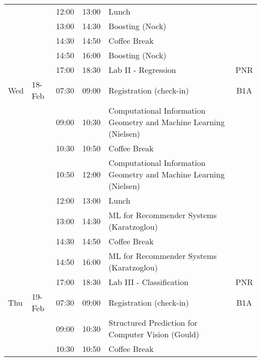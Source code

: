 \begin{longtable}{  p{0.5cm} l l l p{9cm}  c    }
    &        & 12:00 & 13:00 & Lunch                                                             &                   \\
    &        & 13:00 & 14:30 & Boosting (Nock)                                                   &                   \\
    &        & 14:30 & 14:50 & Coffee Break                                                      &                   \\
    &        & 14:50 & 16:00 & Boosting (Nock)                                                   &                   \\
    &        & 17:00 & 18:30 & Lab II - Regression                                               & PNR      \\
   \midrule
Wed & 18-Feb & 07:30 & 09:00 & Registration (check-in)                                           &B1A \\
    &        & 09:00 & 10:30 & Computational Information Geometry and Machine Learning (Nielsen) &                   \\
    &        & 10:30 & 10:50 & Coffee Break                                                      &                   \\
    &        & 10:50 & 12:00 & Computational Information Geometry and Machine Learning (Nielsen) &                   \\
    &        & 12:00 & 13:00 & Lunch                                                             &                   \\
    &        & 13:00 & 14:30 & ML for Recommender Systems (Karatzoglou)                          &                   \\
    &        & 14:30 & 14:50 & Coffee Break                                                      &                   \\
    &        & 14:50 & 16:00 & ML for Recommender Systems (Karatzoglou)                          &                   \\
    &        & 17:00 & 18:30 & Lab III - Classification                                          & PNR      \\
    \midrule
Thu & 19-Feb & 07:30 & 09:00 & Registration (check-in)                                           &B1A \\
    &        & 09:00 & 10:30 & Structured Prediction for Computer Vision (Gould)                 &                   \\
    &        & 10:30 & 10:50 & Coffee Break                                                      &                   \\

\end{longtable}
